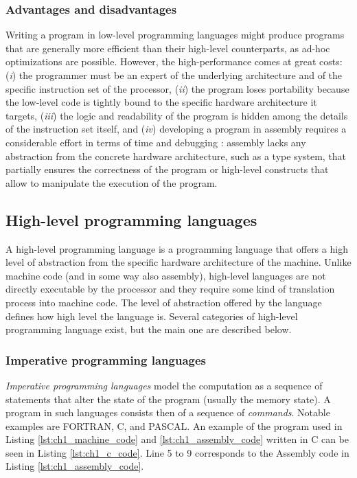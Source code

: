 \subsubsection*{Advantages and disadvantages}
Writing a program in low-level programming languages might produce programs that are generally more efficient than their high-level counterparts, as ad-hoc optimizations are possible. However, the high-performance comes at great costs: (\textit{i}) the programmer must be an expert of the underlying architecture and of the specific instruction set of the processor, (\textit{ii}) the program loses portability because the low-level code is tightly bound to the specific hardware architecture it targets, (\textit{iii}) the logic and readability of the program is hidden among the details of the instruction set itself, and (\textit{iv}) developing a program in assembly requires a considerable effort in terms of time and debugging \cite{frampton2009demystifying}: assembly lacks any abstraction from the concrete hardware architecture, such as a type system, that partially ensures the correctness of the program or high-level constructs that allow to manipulate the execution of the program.

\subsection{High-level programming languages}
\label{subsec:ch1_hl_languages}
A high-level programming language is a programming language that offers a high level of abstraction from the specific hardware architecture of the machine. Unlike machine code (and in some way also assembly), high-level languages are not directly executable by the processor and they require some kind of translation process into machine code. The level of abstraction offered by the language defines how high level the language is. Several categories of high-level programming language exist, but the main one are described below.

\subsubsection*{Imperative programming languages}
\textit{Imperative programming languages} model the computation as a sequence of statements that alter the state of the program (usually the memory state). A program in such languages consists then of a sequence of \textit{commands}. Notable examples are FORTRAN, C, and PASCAL. An example of the program used in Listing \ref{lst:ch1_machine_code} and \ref{lst:ch1_assembly_code} written in C can be seen in Listing \ref{lst:ch1_c_code}. Line 5 to 9 corresponds to the Assembly code in Listing \ref{lst:ch1_assembly_code}.

